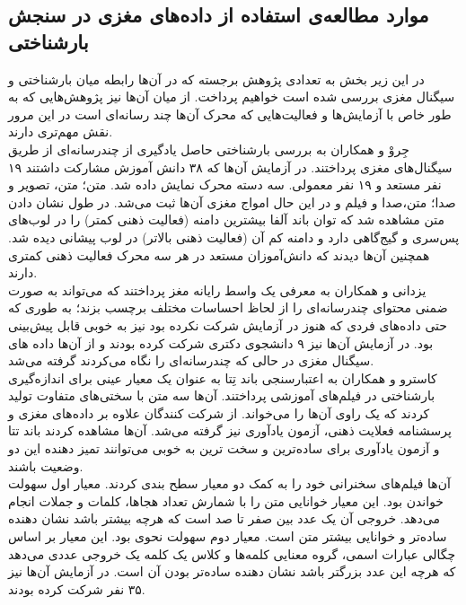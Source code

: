 \subsection{موارد مطالعه‌ی استفاده از داده‌های مغزی در سنجش بارشناختی}
در این زیر بخش به تعدادی پژوهش برجسته که در آن‌ها رابطه میان بارشناختی و سیگنال مغزی بررسی شده است خواهیم پرداخت. از میان آن‌ها نیز پژوهش‌هایی که به طور خاص با آزمایش‌ها و فعالیت‌هایی که محرک آن‌ها چند رسانه‌ای است در این مرور نقش مهم‌تری دارند.
\\
جِروْ و همکاران
\cite{gerve1999multimedia}
به بررسی بارشناختی حاصل یادگیری از چندرسانه‌ای از طریق سیگنال‌های مغزی پرداختند. در آزمایش آن‌ها که ۳۸ دانش آموزش مشارکت داشتند ۱۹ نفر مستعد و ۱۹ نفر معمولی. سه دسته محرک نمایش داده شد. متن؛ متن، تصویر و صدا؛ متن،‌صدا و فیلم و  در این حال امواج مغزی آن‌ها ثبت می‌شد. در طول نشان دادن متن مشاهده شد که توان باند آلفا بیشترین دامنه (فعالیت ذهنی کمتر) را در لوب‌های پس‌سری و گیج‌گاهی دارد و دامنه کم آن (فعالیت ذهنی بالاتر) در لوب پیشانی دیده شد. همچنین آن‌ها دیدند که دانش‌آموزان مستعد در هر سه محرک فعالیت ذهنی کمتری دارند.
\\
یزدانی و همکاران 
\cite{yazdani2009implicit}
به معرفی یک واسط رایانه مغز پرداختند که می‌تواند به صورت ضمنی محتوای‌ چندرسانه‌ای را از لحاظ احساسات مختلف برچسب بزند؛ به طوری که حتی داده‌های فردی که هنوز در آزمایش شرکت نکرده بود نیز به خوبی  قابل پیش‌بینی بود. در آزمایش آن‌ها نیز ۹ دانشجوی دکتری شرکت کرده بودند و از آن‌ها داده های سیگنال مغزی در حالی که چندرسانه‌ای را نگاه می‌کردند گرفته می‌شد.
\\
کاسترو و همکاران
\cite{castro2020validating}
به اعتبارسنجی باند تِتا به عنوان یک معیار عینی برای اندازه‌گیری بارشناختی در فیلم‌های آموزشی پرداختند. آن‌ها سه متن با سختی‌های متفاوت تولید کردند که یک راوی آن‌ها را می‌خواند. از شرکت کنندگان علاوه بر داده‌های مغزی و پرسشنامه فعلایت ذهنی، آزمون یادآوری نیز گرفته می‌شد. آن‌ها مشاهده کردند باند تتا و آزمون یادآوری برای ساده‌ترین و سخت ترین به خوبی می‌توانند تمیز دهنده این دو وضعیت باشند.
\\
آن‌ها فیلم‌های سخنرانی خود را به کمک دو معیار سطح بندی کردند. معیار اول سهولت خواندن
بود. این معیار خوانایی متن را با شمارش تعداد هجا‌ها، کلمات و جملات انجام می‌دهد. خروجی آن یک عدد بین صفر تا صد است که هرچه بیشتر باشد نشان دهنده ساده‌تر و خوانایی بیشتر متن است. معیار دوم سهولت نحوی
بود. این معیار بر اساس چگالی عبارات اسمی، گروه معنایی کلمه‌ها و کلاس یک کلمه یک خروجی عددی می‌دهد که هرچه این عدد بزرگتر باشد نشان دهنده ساده‌تر بودن آن است. در آزمایش آن‌ها نیز ۳۵ نفر شرکت کرده بودند.
\\
